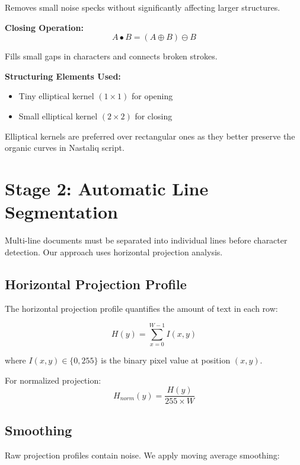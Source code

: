 \documentclass[12pt,a4paper,oneside]{report}
\begin{document}
Removes small noise specks without significantly affecting larger structures.

\textbf{Closing Operation:}
\begin{equation}
    A \bullet B = (A \oplus B) \ominus B
\end{equation}

Fills small gaps in characters and connects broken strokes.

\textbf{Structuring Elements Used:}
\begin{itemize}
    \item Tiny elliptical kernel $(1 \times 1)$ for opening
    \item Small elliptical kernel $(2 \times 2)$ for closing
\end{itemize}

Elliptical kernels are preferred over rectangular ones as they better preserve the organic curves in Nastaliq script.

\section{Stage 2: Automatic Line Segmentation}

Multi-line documents must be separated into individual lines before character detection. Our approach uses horizontal projection analysis.

\subsection{Horizontal Projection Profile}

The horizontal projection profile quantifies the amount of text in each row:

\begin{equation}
    H(y) = \sum_{x=0}^{W-1} I(x, y)
\end{equation}

where $I(x, y) \in \{0, 255\}$ is the binary pixel value at position $(x, y)$.

For normalized projection:
\begin{equation}
    H_{norm}(y) = \frac{H(y)}{255 \times W}
\end{equation}

\subsection{Smoothing}

Raw projection profiles contain noise. We apply moving average smoothing:
\end{document}
